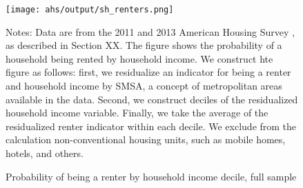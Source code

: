 \begin{figure}[h!]
    \centering
    \caption{Probability of being a renter by household income decile,
    full sample}
    \label{fig:ahs_pr_renters}

    \texttt{[image: ahs/output/sh\_renters.png]}

    \begin{minipage}{.95\textwidth} \footnotesize
        \vspace{3mm}
        Notes: Data are from the 2011 and 2013 American Housing
        Survey \parencite{ahs2020}, as described in 
        Section XX. 
        The figure shows the probability of a household being
        rented by household income. 
        We construct hte figure as follows: first, we residualize an
        indicator for being a renter and household income by SMSA,
        a concept of metropolitan areas available in the data.
        Second, we construct deciles of the residualized household
        income variable.
        Finally, we take the average of the residualized renter 
        indicator within each decile.
        We exclude from the calculation non-conventional housing units, 
        such as mobile homes, hotels, and others.
    \end{minipage}
\end{figure}
